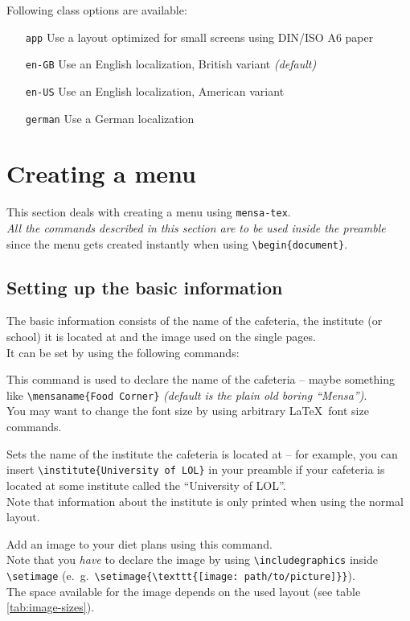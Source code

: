 \documentclass[11pt]{ltxdoc}
\begin{document}
	\bigskip
	Following class options are available:
	\begin{itemize}
		\item[\texttt{app}] Use a layout optimized for small screens using DIN/ISO A6 paper
		\item[\texttt{en-GB}] Use an English localization, British variant \textit{(default)}
		\item[\texttt{en-US}] Use an English localization, American variant
		\item[\texttt{german}] Use a German localization
	\end{itemize}



	\section{Creating a menu}
	This section deals with creating a menu using \texttt{mensa-tex}. \\
	\textit{\color{red} All the commands described in this section are to be used inside the preamble} since the menu gets created instantly when using \verb|\begin{document}|.
	
	\subsection{Setting up the basic information}
	The basic information consists of the name of the cafeteria, the institute (or school) it is located at and the image used on the single pages. \\
	It can be set by using the following commands:
	
	\medskip
	\DescribeMacro{\mensaname}
	This command is used to declare the name of the cafeteria -- maybe something like \verb|\mensaname{Food Corner}| \textit{(default is the plain old boring \enquote{Mensa})}. \\
	You may want to change the font size by using arbitrary \LaTeX\ font size commands.
	
	\medskip
	\DescribeMacro{\institute}
	Sets the name of the institute the cafeteria is located at -- for example, you can insert \verb|\institute{University of LOL}| in your preamble if your cafeteria is located at some institute called the \enquote{University of LOL}. \\
	Note that information about the institute is only printed when using the normal layout.

	\medskip
	\DescribeMacro{\setimage}
	Add an image to your diet plans using this command. \\
	Note that you \textit{have} to declare the image by using \verb|\includegraphics| inside \verb|\setimage| (e.~g.~\verb|\setimage{\texttt{[image: path/to/picture]}}|). \\
	The space available for the image depends on the used layout (see table \ref{tab:image-sizes}).
	
\end{document}
